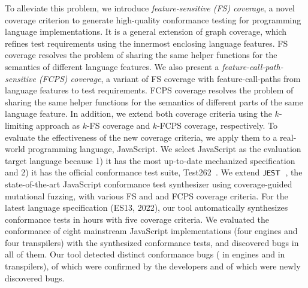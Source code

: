 To alleviate this problem, we introduce \textit{feature-sensitive (FS) coverage},
a novel coverage criterion to generate high-quality conformance testing for
programming language implementations. It is a general extension of graph coverage,
which refines test requirements using the innermost enclosing language features.
FS coverage resolves the problem of sharing the same helper functions
for the semantics of different language features.
We also present a \textit{feature-call-path-sensitive (FCPS) coverage},
a variant of FS coverage with feature-call-paths from language features to test requirements.
FCPS coverage resolves the problem of sharing the same helper functions
for the semantics of different parts of the same language feature.
In addition, we extend both coverage criteria using the $k$-limiting approach as $k$-FS
coverage and $k$-FCPS coverage, respectively.
To evaluate the effectiveness of the new coverage criteria,
we apply them to a real-world programming language, JavaScript.
We select JavaScript as the evaluation target language because
1) it has the most up-to-date mechanized specification and
2) it has the official conformance test suite, Test262~\cite{test262}.
We extend $\textsf{\small JEST}$~\cite{jest}, the state-of-the-art JavaScript conformance test
synthesizer using coverage-guided mutational fuzzing, with various FS
and and FCPS coverage criteria.
For the latest language specification (ES13, 2022), our tool automatically
synthesizes  conformance tests in  hours with five coverage criteria.
We evaluated the conformance of eight mainstream JavaScript implementations
(four engines and four transpilers) with the synthesized conformance tests,
and discovered bugs in all of them.
Our tool detected  distinct conformance bugs ( in engines
and  in transpilers),  of which were confirmed by
the developers and  of which were newly discovered bugs.


